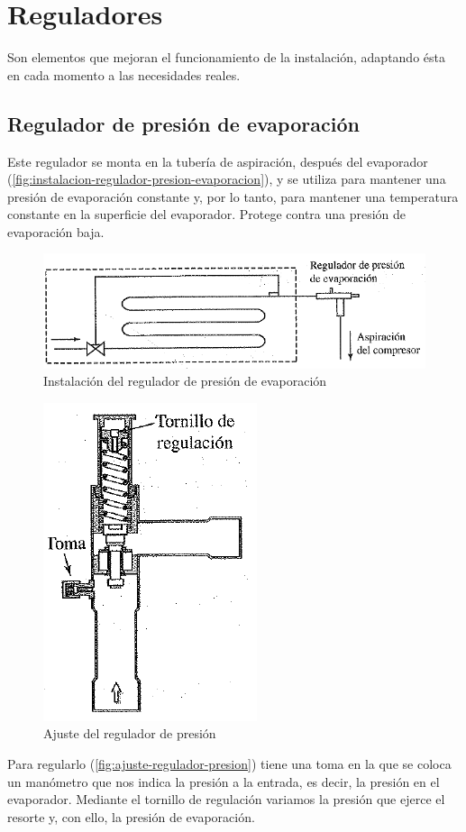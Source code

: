 \section{Reguladores}

Son elementos que mejoran el funcionamiento de la instalaci\'on, adaptando \'esta en cada momento a las necesidades reales.

\subsection{Regulador de presi\'on de evaporaci\'on}

Este regulador se monta en la tuber\'ia de aspiraci\'on, despu\'es del evaporador (\autoref{fig:instalacion-regulador-presion-evaporacion}), y se utiliza para mantener una presi\'on de evaporaci\'on constante y, por lo tanto, para mantener una temperatura constante en la superficie del evaporador. Protege contra una presi\'on de evaporaci\'on baja.

\begin{figure}[H]
    \centering
    \includegraphics[width=.5\linewidth]{figuras/dispositivos-de-expansion/regulador-presion-evaporacion.png}
    \caption{Instalaci\'on del regulador de presi\'on de evaporaci\'on}
    \label{fig:instalacion-regulador-presion-evaporacion}
\end{figure}
\begin{figure}
    \centering
    \includegraphics[width=.4\linewidth]{figuras/dispositivos-de-expansion/ajuste-regulador-presion.png}
    \caption{Ajuste del regulador de presi\'on}
    \label{fig:ajuste-regulador-presion}
\end{figure}
Para regularlo (\autoref{fig:ajuste-regulador-presion}) tiene una toma en la que se coloca un man\'ometro que nos indica la presi\'on a la entrada, es decir, la presi\'on en el evaporador. Mediante el tornillo de regulaci\'on variamos la presi\'on que ejerce el resorte y, con ello, la presi\'on de evaporaci\'on.

